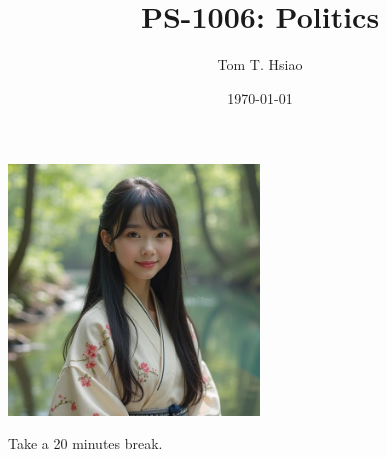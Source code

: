 \documentclass{beamer}
\title{PS-1006: Politics}
\author{Tom T. Hsiao}
\date{\today}
\begin{document}
\begin{frame}{}
\begin{center}
\includegraphics[width=0.5\textwidth]{break.png}
\end{center}
\begin{center}
Take a 20 minutes break.
\end{center}
\end{frame}
\end{document}
